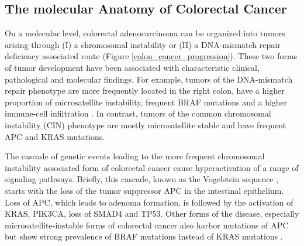 \begin{flushleft}
\section{The molecular Anatomy of Colorectal Cancer}
On a molecular level, colorectal adenocarcinoma can be organized into tumors arising through (I) a chromosomal instability or (II) a DNA-mismatch repair deficiency associated route \cite{Markowitz2009} (Figure \ref{colon_cancer_progression}). These two forms of tumor development have been associated with characteristic clinical, pathological and molecular findings. For example, tumors of the DNA-mismatch repair phenotype are more frequently located in the right colon, have a higher proportion of microsatellite instability, frequent BRAF mutations and a higher immune-cell infiltration \cite{Markowitz2009}. In contrast, tumors of the common chromosomal instability (CIN) phenotype are mostly microsatellite stable and have frequent APC and KRAS mutations. \par 

The cascade of genetic events leading to the more frequent chromosomal instability associated form of colorectal cancer cause hyperactivation of a range of signaling pathways. Briefly, this cascade, known as the Vogelstein sequence \cite{Cho1992}, starts with the loss of the tumor suppressor APC in the intestinal epithelium. Loss of APC, which leads to adenoma formation, is followed by the activation of KRAS, PIK3CA, loss of SMAD4 and TP53. Other forms of the disease, especially microsatellite-instable forms of colorectal cancer also harbor mutations of APC but show strong prevalence of BRAF mutations instead of KRAS mutations \cite{Guinney2015TheCancer.}. \par 


\end{flushleft}
